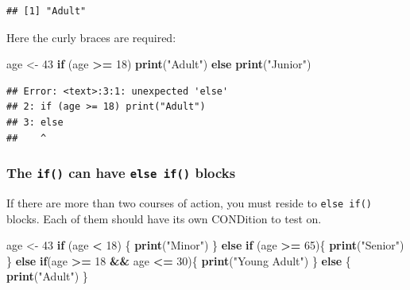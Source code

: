 \documentclass[]{book}
\newenvironment{Shaded}{\begin{snugshade}}{\end{snugshade}}
\newcommand{\ControlFlowTok}[1]{\textcolor[rgb]{0.13,0.29,0.53}{\textbf{#1}}}
\newcommand{\DecValTok}[1]{\textcolor[rgb]{0.00,0.00,0.81}{#1}}
\newcommand{\KeywordTok}[1]{\textcolor[rgb]{0.13,0.29,0.53}{\textbf{#1}}}
\newcommand{\NormalTok}[1]{#1}
\newcommand{\OperatorTok}[1]{\textcolor[rgb]{0.81,0.36,0.00}{\textbf{#1}}}
\newcommand{\StringTok}[1]{\textcolor[rgb]{0.31,0.60,0.02}{#1}}
\begin{document}
\begin{verbatim}
## [1] "Adult"
\end{verbatim}

Here the curly braces are required:

\begin{Shaded}
\begin{Highlighting}[]
\NormalTok{age <-}\StringTok{ }\DecValTok{43}
\ControlFlowTok{if}\NormalTok{ (age }\OperatorTok{>=}\StringTok{ }\DecValTok{18}\NormalTok{) }\KeywordTok{print}\NormalTok{(}\StringTok{"Adult"}\NormalTok{)}
\ControlFlowTok{else} \KeywordTok{print}\NormalTok{(}\StringTok{"Junior"}\NormalTok{)}
\end{Highlighting}
\end{Shaded}

\begin{verbatim}
## Error: <text>:3:1: unexpected 'else'
## 2: if (age >= 18) print("Adult")
## 3: else
##    ^
\end{verbatim}

\hypertarget{the-if-can-have-else-if-blocks}{%
\subsubsection*{\texorpdfstring{The \texttt{if()} can have \texttt{else\ if()} blocks}{The if() can have else if() blocks}}\label{the-if-can-have-else-if-blocks}}

If there are more than two courses of action, you must reside to \texttt{else\ if()} blocks.
Each of them should have its own CONDition to test on.

\begin{Shaded}
\begin{Highlighting}[]
\NormalTok{age <-}\StringTok{ }\DecValTok{43}
\ControlFlowTok{if}\NormalTok{ (age }\OperatorTok{<}\StringTok{ }\DecValTok{18}\NormalTok{) \{}
    \KeywordTok{print}\NormalTok{(}\StringTok{"Minor"}\NormalTok{)}
\NormalTok{\} }\ControlFlowTok{else} \ControlFlowTok{if}\NormalTok{ (age }\OperatorTok{>=}\StringTok{ }\DecValTok{65}\NormalTok{)\{}
    \KeywordTok{print}\NormalTok{(}\StringTok{"Senior"}\NormalTok{)}
\NormalTok{\} }\ControlFlowTok{else} \ControlFlowTok{if}\NormalTok{(age }\OperatorTok{>=}\StringTok{ }\DecValTok{18} \OperatorTok{&&}\StringTok{ }\NormalTok{age }\OperatorTok{<=}\StringTok{ }\DecValTok{30}\NormalTok{)\{}
    \KeywordTok{print}\NormalTok{(}\StringTok{"Young Adult"}\NormalTok{)}
\NormalTok{\} }\ControlFlowTok{else}\NormalTok{ \{}
    \KeywordTok{print}\NormalTok{(}\StringTok{"Adult"}\NormalTok{)}
\NormalTok{\}}
\end{Highlighting}
\end{Shaded}
\end{document}
